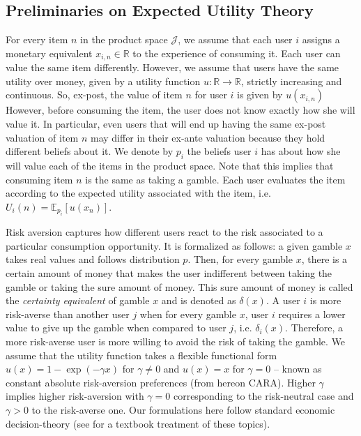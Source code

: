 \documentclass[manuscript]{acmart}
\begin{document}
\subsection{Preliminaries on Expected Utility Theory}
\noindent For every item $n$ in the product space $\mathcal J$, we assume that each user $i$ assigns a monetary equivalent $x_{i,n} \in \mathbb R$ to the experience of consuming it. Each user can value the same item differently. However, we assume that users have the same utility over money, given by a utility function $u: \mathbb R \to \mathbb R$, strictly increasing and continuous. So, ex-post, the value of item $n$ for user $i$ is given by $u(x_{i,n})$ However, before consuming the item, the user does not know exactly how she will value it. In particular, even users that will end up having the same ex-post valuation of item $n$ may differ in their ex-ante valuation because they hold different beliefs about it. We denote by $p_{i}$ the beliefs user $i$ has about how she will value each of the items in the product space. Note that this implies that consuming item $n$ is the same as taking a gamble. Each user evaluates the item according to the expected utility associated with the item, i.e. $U_i(n)=\mathbb E_{p_i}[u(x_n)]$. 
\par
Risk aversion captures how different users react to the risk associated to a particular consumption opportunity. It is formalized as follows: a given gamble $x$ takes real values and follows distribution $p$. Then, for every gamble $x$, there is a certain amount of money that makes the user indifferent between taking the gamble or taking the sure amount of money. This sure amount of money is called the \textit{certainty equivalent} of gamble $x$ and is denoted as $\delta(x)$. A user $i$ is more risk-averse than another user $j$ when for every gamble $x$, user $i$ requires a lower value to give up the gamble when compared to user $j$, i.e. $\delta_i(x)$. Therefore, a more risk-averse user is more willing to avoid the risk of taking the gamble. We assume that the utility function takes a flexible functional form $u(x)=1-\exp(-\gamma x)$ for $\gamma\ne0$ and $u(x)=x$ for $\gamma=0$ -- known as constant absolute risk-aversion preferences (from hereon CARA). Higher $\gamma$ implies higher risk-aversion with $\gamma=0$ corresponding to the risk-neutral case and $\gamma>0$ to the risk-averse one. Our formulations here follow standard economic decision-theory (see \cite{mas1995microeconomic} for a textbook treatment of these topics).
\par
\end{document}

